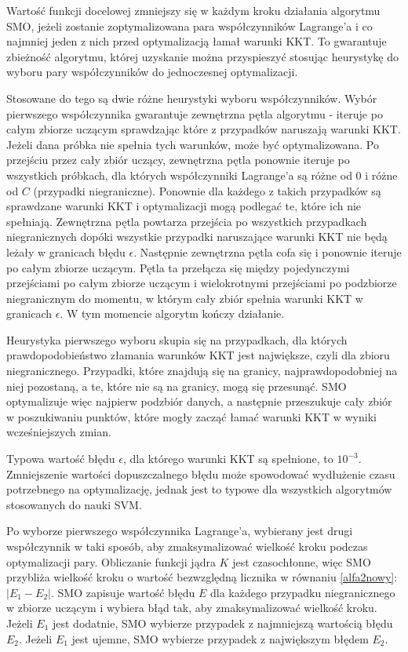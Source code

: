 \documentclass[[10pt,a4paper]{article}
\begin{document}
Wartość funkcji docelowej zmniejszy się w każdym kroku działania algorytmu SMO, jeżeli zostanie zoptymalizowana para współczynników Lagrange'a i co najmniej jeden z nich przed optymalizacją łamał warunki KKT. To gwarantuje zbieżność algorytmu, której uzyskanie można przyspieszyć stosując heurystykę do wyboru pary współczynników do jednoczesnej optymalizacji.


Stosowane do tego są dwie różne heurystyki wyboru współczynników. Wybór pierwszego współczynnika gwarantuje zewnętrzna pętla algorytmu - iteruje po całym zbiorze uczącym sprawdzając które z przypadków naruszają warunki KKT. Jeżeli dana próbka nie spełnia tych warunków, może być optymalizowana. Po przejściu przez cały zbiór uczący, zewnętrzna pętla ponownie iteruje po wszystkich próbkach, dla których współczynniki Lagrange'a są różne od 0 i różne od $C$ (przypadki niegraniczne). Ponownie dla każdego z takich przypadków są sprawdzane warunki KKT i optymalizacji mogą podlegać te, które ich nie spełniają. Zewnętrzna pętla powtarza przejścia po wszystkich przypadkach niegranicznych dopóki wszystkie przypadki naruszające warunki KKT nie będą leżały w granicach błędu $\epsilon$. Następnie zewnętrzna pętla cofa się i ponownie iteruje po całym zbiorze uczącym. Pętla ta przełącza się między pojedynczymi przejściami po całym zbiorze uczącym i wielokrotnymi przejściami po podzbiorze niegranicznym do momentu, w którym cały zbiór spełnia warunki KKT w granicach $\epsilon$. W tym momencie algorytm kończy działanie.


Heurystyka pierwszego wyboru skupia się na przypadkach, dla których prawdopodobieństwo złamania warunków KKT jest największe, czyli dla zbioru niegranicznego. Przypadki, które znajdują się na granicy, najprawdopodobniej na niej pozostaną, a te, które nie są na granicy, mogą się przesunąć. SMO optymalizuje więc najpierw podzbiór danych, a następnie przeszukuje cały zbiór w poszukiwaniu punktów, które mogły zacząć łamać warunki KKT w wyniki wcześniejszych zmian.


Typowa wartość błędu $\epsilon$, dla którego warunki KKT są spełnione, to $10^{-3}$. Zmniejszenie wartości dopuszczalnego błędu może spowodować wydłużenie czasu potrzebnego na optymalizację, jednak jest to typowe dla wszystkich algorytmów stosowanych do nauki SVM.


Po wyborze pierwszego współczynnika Lagrange'a, wybierany jest drugi współczynnik w taki sposób, aby zmaksymalizować wielkość kroku podczas optymalizacji pary. Obliczanie funkcji jądra $K$ jest czasochłonne, więc SMO przybliża wielkość kroku o wartość bezwzględną licznika w równaniu \ref{alfa2nowy}: $|E_1 - E_2|$. SMO zapisuje wartość błędu $E$ dla każdego przypadku niegranicznego w zbiorze uczącym i wybiera błąd tak, aby zmaksymalizować wielkość kroku. Jeżeli $E_1$ jest dodatnie, SMO wybierze przypadek z najmniejszą wartością błędu $E_2$. Jeżeli $E_1$ jest ujemne, SMO wybierze przypadek z największym błędem $E_2$.
\end{document}
